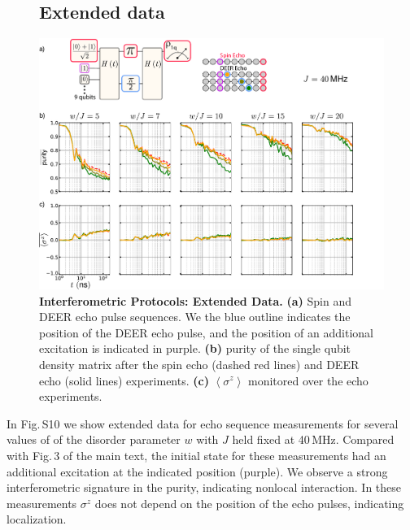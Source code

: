 \begin{figure}
\subsection{Extended data}
\centering
\includegraphics[width=140mm, keepaspectratio]{./PDF/fs9_190919_513p.pdf}%
\caption{\textbf{Interferometric Protocols:  Extended Data.}
\textbf{(a)} Spin and DEER echo pulse sequences.  We the blue outline indicates the position of the DEER echo pulse, and the position of an additional excitation is indicated in purple.
\textbf{(b)} purity of the single qubit density matrix after the spin echo (dashed red lines) and DEER echo (solid lines) experiments.
\textbf{(c)} $\left< \sigma^z \right>$ monitored over the echo experiments.
}
\label{fig_3}
\end{figure}

In Fig.\,S10 we show extended data for echo sequence measurements for several values of of the disorder parameter $w$ with $J$ held fixed at 40\,MHz.  Compared with Fig.\,3 of the main text, the initial state for these measurements had an additional excitation at the indicated position (purple).  We observe a strong interferometric signature in the purity, indicating nonlocal interaction.  In these measurements $\sigma^z$ does not depend on the position of the echo pulses, indicating localization.


